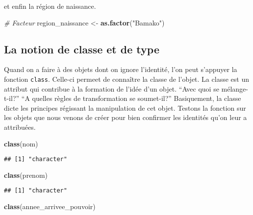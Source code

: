 \documentclass[]{book}
\newenvironment{Shaded}{\begin{snugshade}}{\end{snugshade}}
\newcommand{\KeywordTok}[1]{\textcolor[rgb]{0.13,0.29,0.53}{\textbf{#1}}}
\newcommand{\StringTok}[1]{\textcolor[rgb]{0.31,0.60,0.02}{#1}}
\newcommand{\CommentTok}[1]{\textcolor[rgb]{0.56,0.35,0.01}{\textit{#1}}}
\newcommand{\NormalTok}[1]{#1}
\begin{document}
et enfin la région de naissance.

\begin{Shaded}
\begin{Highlighting}[]
\CommentTok{# Facteur}
\NormalTok{region_naissance <-}\StringTok{ }\KeywordTok{as.factor}\NormalTok{(}\StringTok{"Bamako"}\NormalTok{)}
\end{Highlighting}
\end{Shaded}

\subsection{La notion de classe et de
type}\label{la-notion-de-classe-et-de-type}

Quand on a faire à des objets dont on ignore l'identité, l'on peut
s'appuyer la fonction \texttt{class}. Celle-ci permeet de connaître la
classe de l'objet. La classe est un attribut qui contribue à la
formation de l'idée d'un objet. ``Avec quoi se mélange-t-il?'' ``A
quelles règles de transformation se soumet-il?'' Basiquement, la classe
dicte les principes régissant la manipulation de cet objet. Testons la
fonction sur les objets que nous venons de créer pour bien confirmer les
identités qu'on leur a attribuées.

\begin{Shaded}
\begin{Highlighting}[]
\KeywordTok{class}\NormalTok{(nom)}
\end{Highlighting}
\end{Shaded}

\begin{verbatim}
## [1] "character"
\end{verbatim}

\begin{Shaded}
\begin{Highlighting}[]
\KeywordTok{class}\NormalTok{(prenom)}
\end{Highlighting}
\end{Shaded}

\begin{verbatim}
## [1] "character"
\end{verbatim}

\begin{Shaded}
\begin{Highlighting}[]
\KeywordTok{class}\NormalTok{(annee_arrivee_pouvoir)}
\end{Highlighting}
\end{Shaded}
\end{document}
